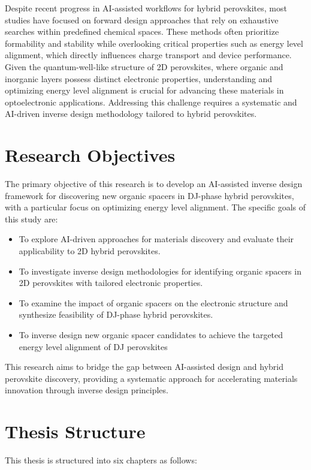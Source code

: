 Despite recent progress in AI-assisted workflows for hybrid perovskites, most studies have focused on forward design approaches that rely on exhaustive searches within predefined chemical spaces\cite{RN315,RN283}. These methods often prioritize formability and stability while overlooking critical properties such as energy level alignment, which directly influences charge transport and device performance. Given the quantum-well-like structure of 2D perovskites, where organic and inorganic layers possess distinct electronic properties, understanding and optimizing energy level alignment is crucial for advancing these materials in optoelectronic applications\cite{RN18}. Addressing this challenge requires a systematic and AI-driven inverse design methodology tailored to hybrid perovskites.


\section{Research Objectives}

The primary objective of this research is to develop an AI-assisted inverse design framework for discovering new organic spacers in DJ-phase hybrid perovskites, with a particular focus on optimizing energy level alignment. The specific goals of this study are:
\begin{itemize}
\item To explore AI-driven approaches for materials discovery and evaluate their applicability to 2D hybrid perovskites.
\item To investigate inverse design methodologies for identifying organic spacers in 2D perovskites with tailored electronic properties.
\item To examine the impact of organic spacers on the electronic structure and synthesize feasibility of DJ-phase hybrid perovskites.
\item To inverse design new organic spacer candidates to achieve the targeted energy level alignment of DJ perovskites
\end{itemize}

This research aims to bridge the gap between AI-assisted design and hybrid perovskite discovery, providing a systematic approach for accelerating materials innovation through inverse design principles.

\section{Thesis Structure}
This thesis is structured into six chapters as follows:

